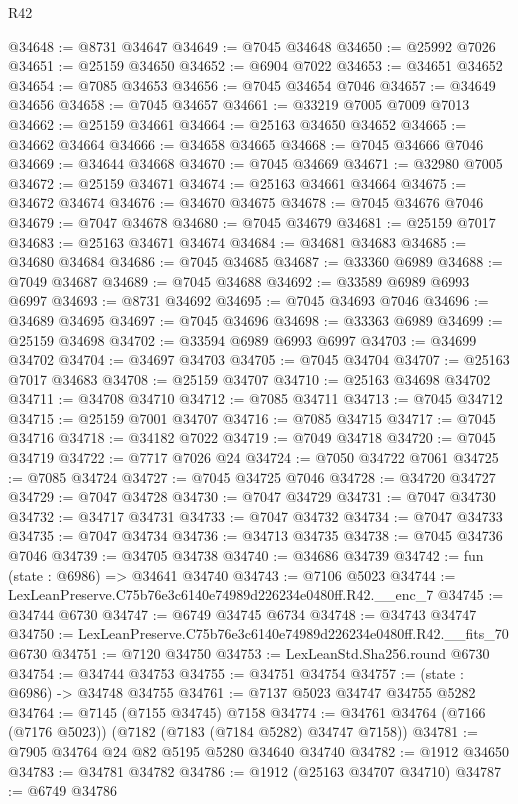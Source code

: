 \begin{lexlean}{R42}
\begin{coremodule}
{@34648 := @8731 @34647
@34649 := @7045 @34648
@34650 := @25992 @7026
@34651 := @25159 @34650
@34652 := @6904 @7022
@34653 := @34651 @34652
@34654 := @7085 @34653
@34656 := @7045 @34654 @7046
@34657 := @34649 @34656
@34658 := @7045 @34657
@34661 := @33219 @7005 @7009 @7013
@34662 := @25159 @34661
@34664 := @25163 @34650 @34652
@34665 := @34662 @34664
@34666 := @34658 @34665
@34668 := @7045 @34666 @7046
@34669 := @34644 @34668
@34670 := @7045 @34669
@34671 := @32980 @7005
@34672 := @25159 @34671
@34674 := @25163 @34661 @34664
@34675 := @34672 @34674
@34676 := @34670 @34675
@34678 := @7045 @34676 @7046
@34679 := @7047 @34678
@34680 := @7045 @34679
@34681 := @25159 @7017
@34683 := @25163 @34671 @34674
@34684 := @34681 @34683
@34685 := @34680 @34684
@34686 := @7045 @34685
@34687 := @33360 @6989
@34688 := @7049 @34687
@34689 := @7045 @34688
@34692 := @33589 @6989 @6993 @6997
@34693 := @8731 @34692
@34695 := @7045 @34693 @7046
@34696 := @34689 @34695
@34697 := @7045 @34696
@34698 := @33363 @6989
@34699 := @25159 @34698
@34702 := @33594 @6989 @6993 @6997
@34703 := @34699 @34702
@34704 := @34697 @34703
@34705 := @7045 @34704
@34707 := @25163 @7017 @34683
@34708 := @25159 @34707
@34710 := @25163 @34698 @34702
@34711 := @34708 @34710
@34712 := @7085 @34711
@34713 := @7045 @34712
@34715 := @25159 @7001 @34707
@34716 := @7085 @34715
@34717 := @7045 @34716
@34718 := @34182 @7022
@34719 := @7049 @34718
@34720 := @7045 @34719
@34722 := @7717 @7026 @24
@34724 := @7050 @34722 @7061
@34725 := @7085 @34724
@34727 := @7045 @34725 @7046
@34728 := @34720 @34727
@34729 := @7047 @34728
@34730 := @7047 @34729
@34731 := @7047 @34730
@34732 := @34717 @34731
@34733 := @7047 @34732
@34734 := @7047 @34733
@34735 := @7047 @34734
@34736 := @34713 @34735
@34738 := @7045 @34736 @7046
@34739 := @34705 @34738
@34740 := @34686 @34739
@34742 := fun (state : @6986) => @34641 @34740
@34743 := @7106 @5023
@34744 := LexLeanPreserve.C75b76e3c6140e74989d226234e0480ff.R42.__enc_7
@34745 := @34744 @6730
@34747 := @6749 @34745 @6734
@34748 := @34743 @34747
@34750 := LexLeanPreserve.C75b76e3c6140e74989d226234e0480ff.R42.__fits_70 @6730
@34751 := @7120 @34750
@34753 := LexLeanStd.Sha256.round @6730
@34754 := @34744 @34753
@34755 := @34751 @34754
@34757 := (state : @6986) -> @34748 @34755
@34761 := @7137 @5023 @34747 @34755 @5282
@34764 := @7145 (@7155 @34745) @7158
@34774 := @34761 @34764 (@7166 (@7176 @5023)) (@7182 (@7183 (@7184 @5282) @34747 @7158))
@34781 := @7905 @34764 @24 @82 @5195 @5280 @34640 @34740
@34782 := @1912 @34650
@34783 := @34781 @34782
@34786 := @1912 (@25163 @34707 @34710)
@34787 := @6749 @34786
}
\end{coremodule}
\end{lexlean}
